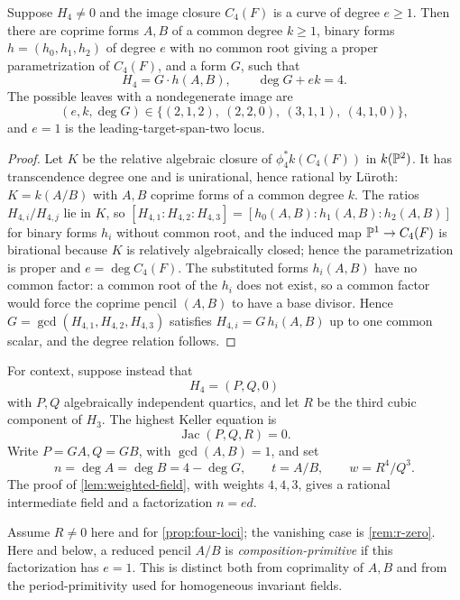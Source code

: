 \documentclass[11pt,reqno]{amsart}
\begin{document}
\begin{lemma}
\label{lem:leading-image}
Suppose \(H_4\ne0\) and the image closure \(C_4(F)\) is a curve of
degree \(e\ge1\).  Then there are coprime forms \(A,B\) of a common
degree \(k\ge1\), binary forms \(h=(h_0,h_1,h_2)\) of degree \(e\)
with no common root giving a proper parametrization of \(C_4(F)\), and a
form \(G\), such that
\[
H_4=G\cdot h(A,B),\qquad \deg G+ek=4.
\]
The possible leaves with a nondegenerate image are
\[
(e,k,\deg G)\in\{(2,1,2),\ (2,2,0),\ (3,1,1),\ (4,1,0)\},
\]
and \(e=1\) is the leading-target-span-two locus.
\end{lemma}

\begin{proof}
Let \(K\) be the relative algebraic closure of
\(\phi_4^*k(C_4(F))\) in \(k(\mathbb P^2)\).  It has transcendence degree
one and is unirational, hence rational by L\"uroth: \(K=k(A/B)\) with
\(A,B\) coprime forms of a common degree \(k\).  The ratios
\(H_{4,i}/H_{4,j}\) lie in \(K\), so
\([H_{4,1}:H_{4,2}:H_{4,3}]=[h_0(A,B):h_1(A,B):h_2(A,B)]\) for binary
forms \(h_i\) without common root, and the induced map
\(\mathbb P^1\to C_4(F)\) is birational because \(K\) is relatively
algebraically closed; hence the parametrization is proper and
\(e=\deg C_4(F)\).  The substituted forms \(h_i(A,B)\) have no common
factor: a common root of the \(h_i\) does not exist, so a common factor
would force the coprime pencil \((A,B)\) to have a base divisor.  Hence
\(G=\gcd(H_{4,1},H_{4,2},H_{4,3})\) satisfies
\(H_{4,i}=G\,h_i(A,B)\) up to one common scalar, and the degree
relation follows.
\end{proof}

For context, suppose instead that
\[
H_4=(P,Q,0)
\]
with \(P,Q\) algebraically independent quartics, and let \(R\) be the third
cubic component of \(H_3\).  The highest Keller equation is
\[
\operatorname{Jac}(P,Q,R)=0.
\]
Write \(P=GA,Q=GB\), with \(\gcd(A,B)=1\), and set
\[
n=\deg A=\deg B=4-\deg G,\qquad
t=A/B,\qquad w=R^4/Q^3.
\]
The proof of \cref{lem:weighted-field}, with weights \(4,4,3\), gives a
rational intermediate field and a factorization \(n=ed\).

Assume \(R\ne0\) here and for \cref{prop:four-loci}; the vanishing
case is \cref{rem:r-zero}.  Here and below, a reduced pencil \(A/B\) is
\emph{composition-primitive} if this factorization has \(e=1\).  This is
distinct both from coprimality of \(A,B\) and from the period-primitivity
used for homogeneous invariant fields.
\end{document}
